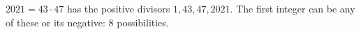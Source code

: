 $2021=43\cdot47$ has the positive divisors $1,43,47,2021$. The first integer can be any of these or its negative: $\boxed{8}$ possibilities.
